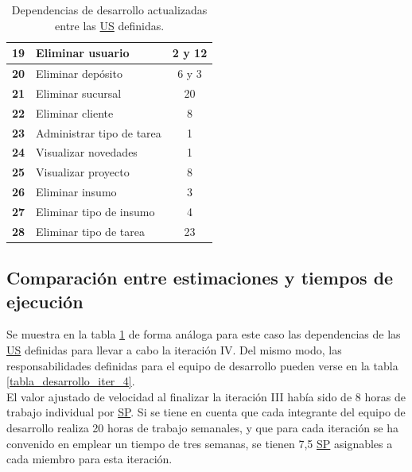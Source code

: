\documentclass[a4paper, 12pt,twoside]{report}  %
\numberwithin{equation}{subsection} %
\begin{document}
\begin{table}[h!]
\begin{tabular}{ |p{0.5cm}|p{9cm}|c|  }
		\hline
		\textbf{19} & Eliminar usuario & 2 y 12 \\
		\hline
		\textbf{20} & Eliminar depósito & 6 y 3 \\
		\hline
		\textbf{21} & Eliminar sucursal & 20 \\
		\hline
		\textbf{22} & Eliminar cliente & 8 \\
		\hline
		\textbf{23} & \cellcolor{marca_US_realizada_anterior}Administrar tipo de tarea & 1 
		\\
		\hline
		\textbf{24} & \cellcolor{marca_US_realizada_anterior}Visualizar novedades & 1 
		\\
		\hline
		\textbf{25} & \cellcolor{marca_US_realizada}Visualizar proyecto & 8 
		\\
		\hline
		\textbf{26} & Eliminar insumo & 3 
		\\
		\hline
		\textbf{27} & Eliminar tipo de insumo & 4 
		\\
		\hline
		\textbf{28} & Eliminar tipo de tarea & 23 
		\\
		\hline
	\end{tabular}
	\caption{Dependencias de desarrollo actualizadas entre las \protect\hyperlink{US}{US} definidas.}
	\label{tabla_dependencias_us_it4}
\end{table}

\subsection{Comparación entre estimaciones y tiempos de ejecución}
Se muestra en la tabla \ref{tabla_dependencias_us_it4} de forma análoga para este caso las dependencias de las \hyperlink{US}{US} definidas para llevar a cabo la iteración IV. Del mismo modo, las responsabilidades definidas para el equipo de desarrollo pueden verse en la tabla \ref{tabla_desarrollo_iter_4}.\\
\indent El valor ajustado de velocidad al finalizar la iteración III había sido de 8 horas de trabajo individual por \hyperlink{SP}{SP}. Si se tiene en cuenta que cada integrante del equipo de desarrollo realiza 20 horas de trabajo semanales, y que para cada iteración se ha convenido en emplear un tiempo de tres semanas, se tienen 7,5 \hyperlink{SP}{SP} asignables a cada miembro para esta iteración.
\end{document}
